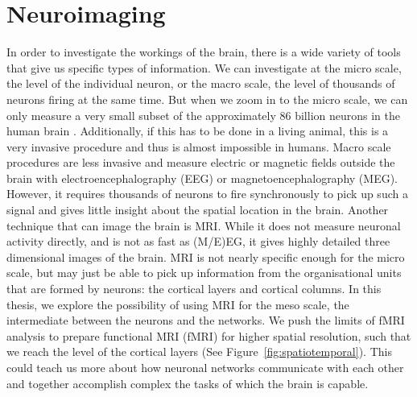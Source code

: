 \section*{Neuroimaging}
In order to investigate the workings of the brain, there is a wide variety of tools that give us specific types of information. We can investigate at the micro scale, the level of the individual neuron, or the macro scale, the level of thousands of neurons firing at the same time. But when we zoom in to the micro scale, we can only measure a very small subset of the approximately 86 billion neurons in the human brain \cite{Herculano-Houzel2009}. Additionally, if this has to be done in a living animal, this is a very invasive procedure and thus is almost impossible in humans. Macro scale procedures are less invasive and measure electric or magnetic fields outside the brain with electroencephalography (EEG) or magnetoencephalography (MEG). However, it requires thousands of neurons to fire synchronously to pick up such a signal and gives little insight about the spatial location in the brain. Another technique that can image the brain is MRI. While it does not measure neuronal activity directly, and is not as fast as (M/E)EG, it gives highly detailed three dimensional images of the brain. MRI is not nearly specific enough for the micro scale, but may just be able to pick up information from the organisational units that are formed by neurons: the cortical layers and cortical columns. In this thesis, we explore the possibility of using MRI for the meso scale, the intermediate between the neurons and the networks. We push the limits of fMRI analysis to prepare functional MRI (fMRI) for higher spatial resolution, such that we reach the level of the cortical layers (See Figure~\ref{fig:spatiotemporal}). This could teach us more about how neuronal networks communicate with each other and together accomplish complex the tasks of which the brain is capable. 



